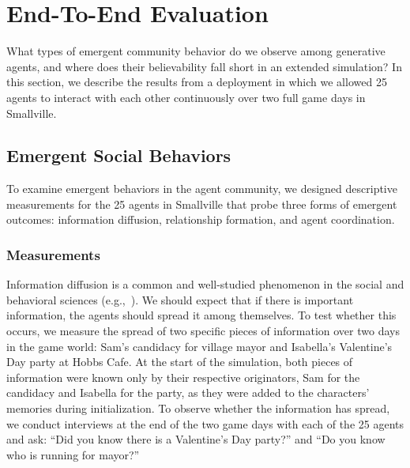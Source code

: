 

\section{End-To-End Evaluation}
What types of emergent community behavior do we observe among generative agents, and where does their believability fall short in an extended simulation? In this section, we describe the results from a deployment in which we allowed 25 agents to interact with each other continuously over two full game days in Smallville.

\subsection{Emergent Social Behaviors} 
To examine emergent behaviors in the agent community, we designed descriptive measurements for the 25 agents in Smallville that probe three forms of emergent outcomes: information diffusion, relationship formation, and agent coordination.

\subsubsection{Measurements} 
Information diffusion is a common and well-studied phenomenon in the social and behavioral sciences (e.g.,~\cite{easley2010networks}). We should expect that if there is important information, the agents should spread it among themselves. To test whether this occurs, we measure the spread of two specific pieces of information over two days in the game world: Sam's candidacy for village mayor and Isabella's Valentine's Day party at Hobbs Cafe. At the start of the simulation, both pieces of information were known only by their respective originators, Sam for the candidacy and Isabella for the party, as they were added to the characters' memories during initialization. To observe whether the information has spread, we conduct interviews at the end of the two game days with each of the 25 agents and ask: ``Did you know there is a Valentine's Day party?'' and ``Do you know who is running for mayor?''

